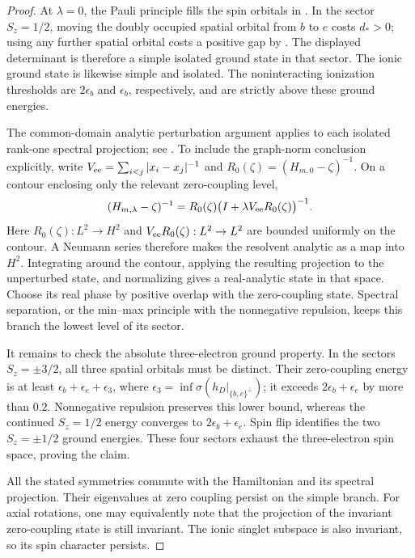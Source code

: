 \begin{proof}
At \(\lambda=0\), the Pauli principle fills the spin orbitals in
.  In the sector \(S_z=1/2\), moving
the doubly occupied spatial orbital from \(b\) to \(e\) costs
\(d_*>0\); using any further spatial orbital costs a positive gap
by .  The displayed determinant is
therefore a simple isolated ground state in that sector.  The ionic
ground state is likewise simple and isolated.  The noninteracting
ionization thresholds are \(2\epsilon_b\) and \(\epsilon_b\),
respectively, and are strictly above these ground energies.

The common-domain analytic perturbation argument applies to each
isolated rank-one spectral projection; see
\cite[Chapter~VII, \S1.3, Theorem~1.7, and \S2.2, Theorem~2.6]{Kato}.
To include the graph-norm conclusion explicitly, write
\(V_{\rm ee}=\sum_{i<j}|x_i-x_j|^{-1}\) and
\(R_0(\zeta)=(H_{m,0}-\zeta)^{-1}\).  On a contour enclosing only
the relevant zero-coupling level,
\[
 (H_{m,\lambda}-\zeta)^{-1}
 =R_0(\zeta)\bigl(I+\lambda V_{\rm ee}R_0(\zeta)\bigr)^{-1}.
\]
Here \(R_0(\zeta):L^2\to H^2\) and
\(V_{\rm ee}R_0(\zeta):L^2\to L^2\) are bounded uniformly on the
contour.  A Neumann series therefore makes the resolvent analytic
as a map into \(H^2\).  Integrating around the contour, applying the
resulting projection to the unperturbed state, and normalizing gives
a real-analytic state in that space.  Choose its
real phase by positive overlap with the zero-coupling state.
Spectral separation, or the min--max principle with the nonnegative
repulsion, keeps this branch the lowest level of its sector.

It remains to check the absolute three-electron ground property.
In the sectors \(S_z=\pm3/2\), all three spatial orbitals must be
distinct.  Their zero-coupling energy is at least
\(\epsilon_b+\epsilon_e+\epsilon_3\), where
\(\epsilon_3=\inf\sigma(h_D|_{\{b,e\}^\perp})\); it exceeds
\(2\epsilon_b+\epsilon_e\) by more than \(0.2\).
Nonnegative repulsion preserves this lower bound, whereas the
continued \(S_z=1/2\) energy converges to
\(2\epsilon_b+\epsilon_e\).  Spin flip identifies the two
\(S_z=\pm1/2\) ground energies.  These four sectors exhaust the
three-electron spin space, proving the claim.

All the stated symmetries commute with the Hamiltonian and its
spectral projection.  Their eigenvalues at zero coupling persist on
the simple branch.  For axial rotations, one may equivalently note
that the projection of the invariant zero-coupling state is still
invariant.  The ionic singlet subspace is also invariant, so its
spin character persists.
\end{proof}

